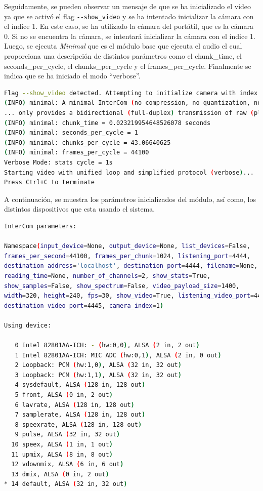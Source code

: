 Seguidamente, se pueden observar un mensaje de que se ha inicializado el vídeo ya que se activó el flag \verb|--show_video| y se ha intentado inicializar la cámara con el índice 1. En este caso, se ha utilizado la cámara del portátil, que es la cámara 0. Si no se encuentra la cámara, se intentará inicializar la cámara con el índice 1. Luego, se ejecuta \textit{Minimal} que es el módulo base que ejecuta el audio el cual proporciona una descripción de distintos parámetros como el chunk\_time, el seconds\_per\_cycle, el chunks\_per\_cycle y el frames\_per\_cycle. Finalmente se indica que se ha iniciado el modo ``verbose''.

\begin{lstlisting}[language=bash,basicstyle=\ttfamily\scriptsize]
Flag --show_video detected. Attempting to initialize camera with index 1...
(INFO) minimal: A minimal InterCom (no compression, no quantization, no transform, 
... only provides a bidirectional (full-duplex) transmission of raw (playable) chunks. 
(INFO) minimal: chunk_time = 0.023219954648526078 seconds
(INFO) minimal: seconds_per_cycle = 1
(INFO) minimal: chunks_per_cycle = 43.06640625
(INFO) minimal: frames_per_cycle = 44100
Verbose Mode: stats cycle = 1s
Starting video with unified loop and simplified protocol (verbose)...
Press Ctrl+C to terminate
\end{lstlisting}

A continuación, se muestra los parámetros inicializados del módulo, así como, los distintos dispositivos que esta usando el sistema.
\begin{lstlisting}[language=bash,basicstyle=\ttfamily\scriptsize]
InterCom parameters:

Namespace(input_device=None, output_device=None, list_devices=False, 
frames_per_second=44100, frames_per_chunk=1024, listening_port=4444, 
destination_address='localhost', destination_port=4444, filename=None, 
reading_time=None, number_of_channels=2, show_stats=True, 
show_samples=False, show_spectrum=False, video_payload_size=1400, 
width=320, height=240, fps=30, show_video=True, listening_video_port=4445, 
destination_video_port=4445, camera_index=1)

Using device:

   0 Intel 82801AA-ICH: - (hw:0,0), ALSA (2 in, 2 out)
   1 Intel 82801AA-ICH: MIC ADC (hw:0,1), ALSA (2 in, 0 out)
   2 Loopback: PCM (hw:1,0), ALSA (32 in, 32 out)
   3 Loopback: PCM (hw:1,1), ALSA (32 in, 32 out)
   4 sysdefault, ALSA (128 in, 128 out)
   5 front, ALSA (0 in, 2 out)
   6 lavrate, ALSA (128 in, 128 out)
   7 samplerate, ALSA (128 in, 128 out)
   8 speexrate, ALSA (128 in, 128 out)
   9 pulse, ALSA (32 in, 32 out)
  10 speex, ALSA (1 in, 1 out)
  11 upmix, ALSA (8 in, 8 out)
  12 vdownmix, ALSA (6 in, 6 out)
  13 dmix, ALSA (0 in, 2 out)
* 14 default, ALSA (32 in, 32 out)
\end{lstlisting}


